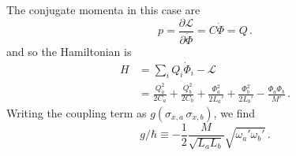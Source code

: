The conjugate momenta in this case are
\begin{equation}
  p = \frac{\partial \mathcal{L}}{\partial \dot{\Phi}} = C \dot{\Phi} = Q \, .
\end{equation}
and so the Hamiltonian is
\begin{align}
  H
  &= \sum_i Q_i \dot{\Phi}_i - \mathcal{L} \nonumber \\
  &=
    \frac{Q_a^2}{2 C_a} + \frac{Q_b^2}{2 C_b}
    + \frac{\Phi_a^2}{2L_a'} + \frac{\Phi_b^2}{2L_b'}
    - \frac{\Phi_a \Phi_b}{M'}
  \, .
\end{align}
Writing the coupling term as $g (\sigma_{x,a} \, \sigma_{x,b})$, we find
\begin{equation}
  g/\hbar \equiv - \frac{1}{2} \frac{M}{\sqrt{L_a L_b}} \sqrt{\omega_a' \omega_b'}
  \, .
\end{equation}
